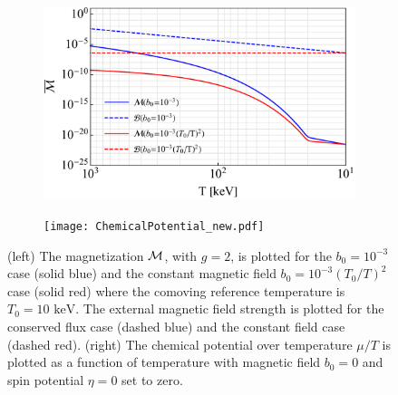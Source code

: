 \documentclass[a4paper]{article}
\newcommand*{\keV}{\text{ keV}}
\begin{document}
\begin{figure}[ht]
    \centering
    \begin{subfigure}{0.49\textwidth}
        \includegraphics[width=\textwidth]{DensityPairEffect.pdf}
    \end{subfigure}
    \hfill
    \begin{subfigure}{0.49\textwidth}
        \texttt{[image: ChemicalPotential\_new.pdf]}
    \end{subfigure}
    \caption{(left) The magnetization ${\cal M}$, with $g=2$, is plotted for the $b_{0}=10^{-3}$ case (solid blue) and the constant magnetic field $b_{0}=10^{-3}(T_{0}/T)^{2}$ case (solid red) where the comoving reference temperature is $T_{0}=10\keV$. The external magnetic field strength is plotted for the conserved flux case (dashed blue) and the constant field case (dashed red). (right) The chemical potential over temperature $\mu/T$ is plotted as a function of temperature with magnetic field $b_{0}=0$ and spin potential $\eta=0$ set to zero.}
    \label{fig:paireffect}
\end{figure}
\end{document}
